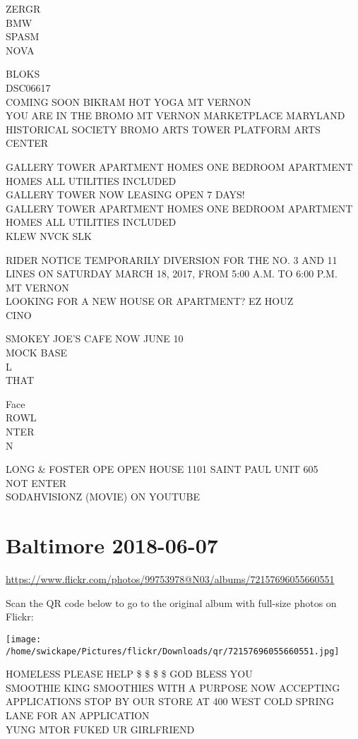 \documentclass[10pt,letterpaper]{article}
\begin{document}
ZERGR\\
BMW\\
SPASM\\
NOVA

BLOKS\\
DSC06617\\
COMING SOON BIKRAM HOT YOGA MT VERNON\\
YOU ARE IN THE BROMO MT VERNON MARKETPLACE MARYLAND HISTORICAL SOCIETY BROMO ARTS TOWER PLATFORM ARTS CENTER

GALLERY TOWER APARTMENT HOMES ONE BEDROOM APARTMENT HOMES ALL UTILITIES INCLUDED\\
GALLERY TOWER NOW LEASING OPEN 7 DAYS!\\
GALLERY TOWER APARTMENT HOMES ONE BEDROOM APARTMENT HOMES ALL UTILITIES INCLUDED\\
KLEW NVCK SLK

RIDER NOTICE TEMPORARILY DIVERSION FOR THE NO. 3 AND 11 LINES ON SATURDAY MARCH 18, 2017, FROM 5:00 A.M. TO 6:00 P.M.\\
MT VERNON\\
LOOKING FOR A NEW HOUSE OR APARTMENT?  EZ HOUZ\\
CINO

SMOKEY JOE'S CAFE NOW JUNE 10\\
MOCK BASE\\
L\\
THAT

Face\\
ROWL\\
NTER\\
N

LONG \& FOSTER OPE OPEN HOUSE 1101 SAINT PAUL UNIT 605\\
NOT ENTER\\
SODAHVISIONZ (MOVIE) ON YOUTUBE
\pagebreak

\section*{Baltimore 2018-06-07}

\url{https://www.flickr.com/photos/99753978@N03/albums/72157696055660551}

Scan the QR code below to go to the original album with full-size photos on Flickr:

\texttt{[image: /home/swickape/Pictures/flickr/Downloads/qr/72157696055660551.jpg]}
\pagebreak

HOMELESS PLEASE HELP \$ \$ \$ \$ GOD BLESS YOU\\
SMOOTHIE KING SMOOTHIES WITH A PURPOSE NOW ACCEPTING APPLICATIONS STOP BY OUR STORE AT 400 WEST COLD SPRING LANE FOR AN APPLICATION\\
YUNG MTOR FUKED UR GIRLFRIEND
\end{document}

